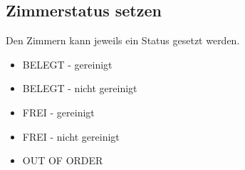 \documentclass[../SubfileFeatures.tex]{subfiles}
\begin{document}
    \subsection{Zimmerstatus setzen}
	Den Zimmern kann jeweils ein Status gesetzt werden.
	\begin{itemize}
		\item BELEGT - gereinigt
		\item BELEGT - nicht gereinigt
		\item FREI - gereinigt
		\item FREI - nicht gereinigt
		\item OUT OF ORDER
	\end{itemize}
\end{document}

